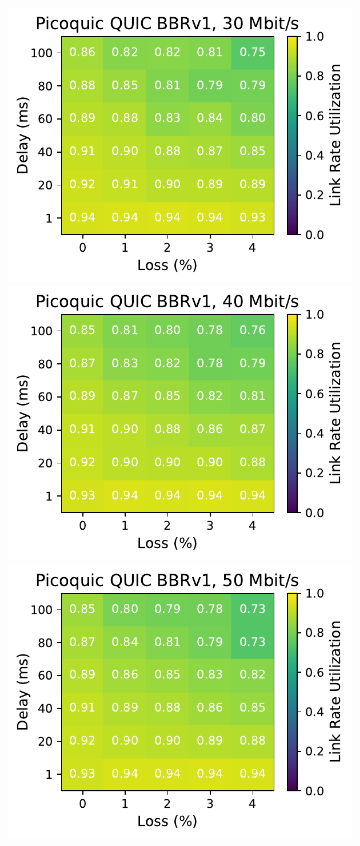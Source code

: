 \begin{figure}[ht]
\begin{subfigure}[b]{0.22\linewidth}
        \includegraphics[width=\linewidth,trim={0 0 2cm 0},clip]{figures/heatmaps/heatmap_picoquic_bbr1_30mbps.pdf}
        \includegraphics[width=\linewidth,trim={0 0 2cm 0},clip]{figures/heatmaps/heatmap_picoquic_bbr1_40mbps.pdf}
        \includegraphics[width=\linewidth,trim={0 0 2cm 0},clip]{figures/heatmaps/heatmap_picoquic_bbr1_50mbps.pdf}

\end{subfigure}
\end{figure}
